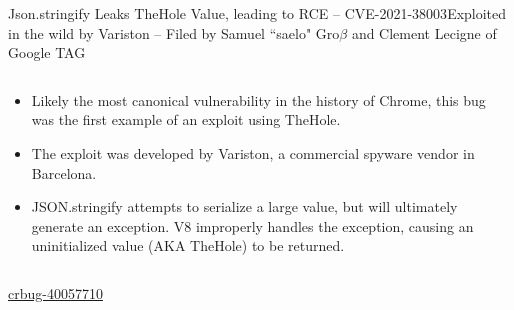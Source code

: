 \begin{frame}{Json.stringify Leaks TheHole Value, leading to RCE -- CVE-2021-38003}{Exploited in the wild by Variston -- Filed by Samuel ``saelo" Gro$\beta$ and Clement Lecigne of Google TAG}
    \begin{columns}
        \begin{column}{0.5\textwidth}
            \begin{itemize}
                \item Likely the most canonical vulnerability in the history of Chrome, this bug was the first example of an exploit using TheHole. 
                \item The exploit was developed by Variston, a commercial spyware vendor in Barcelona. 
                \item JSON.stringify attempts to serialize a large value, but will ultimately generate an exception. V8 improperly handles the exception, causing an uninitialized value (AKA TheHole) to be returned.
            \end{itemize}
        \end{column}
        \begin{column}{0.5\textwidth}
            \inputminted{js}{code/json-stringify.tex}
        \end{column}
    \end{columns}
    \href{https://issues.chromium.org/issues/40057710}{\color{pink}crbug-40057710}
\end{frame}

